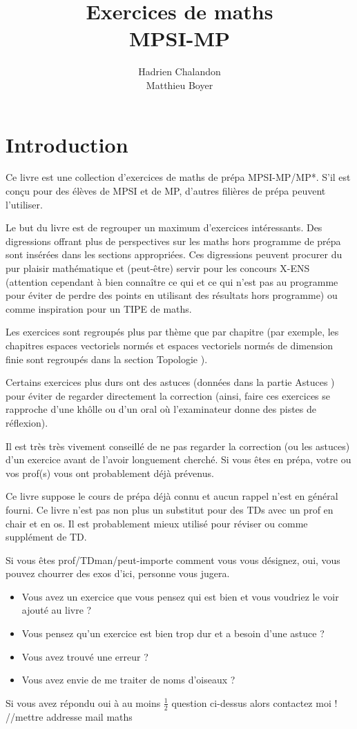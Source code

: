 \documentclass[12pt,a4paper]{exo_book}
\title{Exercices de maths \\ MPSI-MP}
\author{Hadrien {\sc Chalandon} \\ Matthieu {\sc Boyer}}
\date{}
\begin{document}
\chapter*{Introduction}
Ce livre est une collection d'exercices de maths de prépa MPSI-MP/MP*. S'il est conçu pour des élèves de MPSI et de MP, d'autres filières de prépa peuvent l'utiliser.

Le but du livre est de regrouper un maximum d'exercices intéressants. Des digressions offrant plus de perspectives sur les maths hors programme de prépa sont insérées dans les sections appropriées. Ces digressions peuvent procurer du pur plaisir mathématique et (peut-être) servir pour les concours X-ENS (attention cependant à bien connaître ce qui et ce qui n'est pas au programme pour éviter de perdre des points en utilisant des résultats hors programme) ou comme inspiration pour un TIPE de maths.

Les exercices sont regroupés plus par thème que par chapitre (par exemple, les chapitres espaces vectoriels normés et espaces vectoriels normés de dimension finie sont regroupés dans la section \og Topologie \fg).

Certains exercices plus durs ont des astuces (données dans la partie \og Astuces \fg) pour éviter de regarder directement la correction (ainsi, faire ces exercices se rapproche d'une khôlle ou d'un oral où l'examinateur donne des pistes de réflexion).

Il est très très vivement conseillé de ne pas regarder la correction (ou les astuces) d'un exercice avant de l'avoir longuement cherché. Si vous êtes en prépa, votre ou vos prof(s) vous ont probablement déjà prévenus.

Ce livre suppose le cours de prépa déjà connu et aucun rappel n'est en général fourni. Ce livre n'est pas non plus un substitut pour des TDs avec un prof en chair et en os. Il est probablement mieux utilisé pour réviser ou comme supplément de TD.

Si vous êtes prof/TDman/peut-importe comment vous vous désignez, oui, vous pouvez chourrer des exos d'ici, personne vous jugera.

\begin{itemize}
    \item Vous avez un exercice que vous pensez qui est bien et vous voudriez le voir ajouté au livre ?
    \item Vous pensez qu'un exercice est bien trop dur et a besoin d'une astuce ?
    \item Vous avez trouvé une erreur ?
    \item Vous avez envie de me traiter de noms d'oiseaux ?
\end{itemize}
Si vous avez répondu \og oui \fg à au moins $\frac{1}{2}$ question ci-dessus alors contactez moi ! //mettre addresse mail maths 
\end{document}
